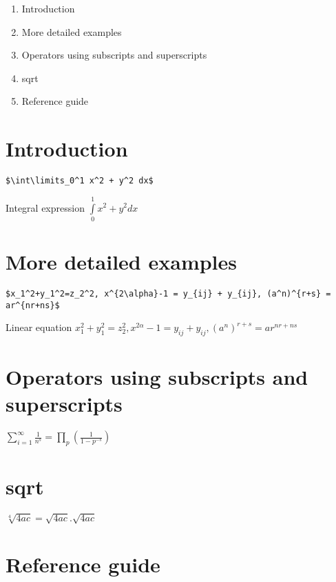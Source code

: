 \documentclass{article}
\begin{document}
  \begin{enumerate}
   \item Introduction
   \item More detailed examples
   \item Operators using subscripts and superscripts
   \item sqrt
   \item Reference guide
  \end{enumerate}
  
  \section{Introduction}

  \verb|$\int\limits_0^1 x^2 + y^2 dx$| 
  
  \noindent Integral expression $\int\limits_0^1 x^2 + y^2 dx$
  
  \section{More detailed examples}
  
  \verb|$x_1^2+y_1^2=z_2^2, x^{2\alpha}-1 = y_{ij} + y_{ij}, (a^n)^{r+s} = ar^{nr+ns}$|
  
  \vspace{20pt}
  
  \noindent Linear equation $x_1^2+y_1^2=z_2^2, x^{2\alpha}-1 = y_{ij} + y_{ij}, (a^n)^{r+s} = ar^{nr+ns}$
  
  \section{Operators using subscripts and superscripts}
  
  $\sum_{i=1}^{\infty} \frac{1}{n^s} = \prod_p (\frac{1}{1 - p^{-s}})$
  
  \section{sqrt}
  
  $\sqrt[4]{4ac} = \sqrt{4ac}.\sqrt{4ac}$

 \section{Reference guide}
 
\end{document}
